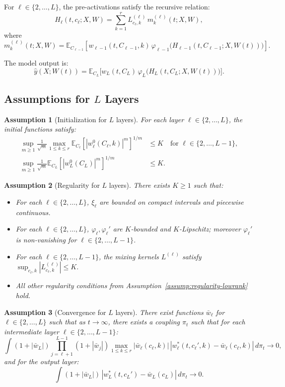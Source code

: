 \documentclass[11pt]{article}
\newcommand{\E}{\mathbb{E}}
\newcommand{\1}{\mathbbm{1}}
\newtheorem{assumption}{Assumption}
\begin{document}
For $\ell\in\{2,\dots,L\}$, the pre-activations satisfy the recursive relation:
\[
H_\ell(t,c_\ell;X,W) = \sum_{k=1}^r L^{(\ell)}_{c_\ell,k}\,m_k^{(\ell)}(t;X,W),
\]
where
\[
m_k^{(\ell)}(t;X,W) = \E_{C_{\ell-1}}\!\left[w_{\ell-1}(t,C_{\ell-1},k)\,\varphi_{\ell-1}\!\Big(H_{\ell-1}(t,C_{\ell-1};X,W(t))\Big)\right].
\]

The model output is:
\[
\hat y(X;W(t)) = \E_{C_L}\big[w_L(t,C_L)\,\varphi_L\big(H_L(t,C_L;X,W(t))\big)\big].
\]

\subsection{Assumptions for $L$ Layers}

\begin{assumption}[Initialization for $L$ layers]\label{assump:init-Llayers}
For each layer $\ell\in\{2,\dots,L\}$, the initial functions satisfy:
\begin{align*}
\sup_{m\ge 1}\frac{1}{\sqrt{m}}\max_{1\le k\le r}\E_{C_\ell}\!\left[|w_\ell^0(C_\ell,k)|^m\right]^{1/m} &\le K \quad \text{for } \ell\in\{2,\dots,L-1\},\\
\sup_{m\ge 1}\frac{1}{\sqrt{m}}\E_{C_L}\!\left[|w_L^0(C_L)|^m\right]^{1/m} &\le K.
\end{align*}
\end{assumption}

\begin{assumption}[Regularity for $L$ layers]\label{assump:regularity-Llayers}
There exists $K\ge 1$ such that:
\begin{itemize}
\item For each $\ell\in\{2,\dots,L\}$, $\xi_\ell$ are bounded on compact intervals and piecewise continuous.
\item For each $\ell\in\{2,\dots,L\}$, $\varphi_\ell,\varphi_\ell'$ are $K$-bounded and $K$-Lipschitz; moreover $\varphi_\ell'$ is non-vanishing for $\ell\in\{2,\dots,L-1\}$.
\item For each $\ell\in\{2,\dots,L-1\}$, the mixing kernels $L^{(\ell)}$ satisfy $\sup_{c_\ell,k}|L^{(\ell)}_{c_\ell,k}|\le K$.
\item All other regularity conditions from Assumption~\ref{assump:regularity-lowrank} hold.
\end{itemize}
\end{assumption}

\begin{assumption}[Convergence for $L$ layers]\label{assump:convergence-Llayers}
There exist functions $\bar{w}_\ell$ for $\ell\in\{2,\dots,L\}$ such that as $t\to\infty$, there exists a coupling $\pi_t$ such that for each intermediate layer $\ell\in\{2,\dots,L-1\}$:
\[
\int (1+|\bar{w}_L|)\prod_{j=\ell+1}^{L-1}(1+|\bar{w}_j|)\max_{1\le k\le r}|\bar{w}_\ell(c_\ell,k)|\,|w_\ell^*(t,c_\ell',k)-\bar{w}_\ell(c_\ell,k)|\,d\pi_t \to 0,
\]
and for the output layer:
\[
\int (1+|\bar{w}_L|)\,|w_L^*(t,c_L')-\bar{w}_L(c_L)|\,d\pi_t \to 0.
\]
\end{assumption}
\end{document}
